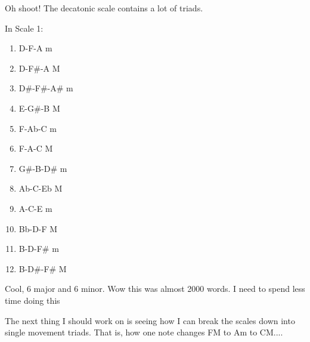 \documentclass[12pt]{article}[titlepage]
\newcommand{\1}{\={a}}
\newcommand{\2}{\={e}}
\newcommand{\3}{\={\i}}
\newcommand{\4}{\=o}
\newcommand{\5}{\=u}
\newcommand{\6}{\={A}}
\renewcommand{\,}{\textsuperscript{,}}
\begin{document}
Oh shoot!
The decatonic scale contains a lot of triads.

In Scale 1:
\begin{enumerate}
\item D-F-A m 
\item D-F\#-A M 
\item D\#-F\#-A\# m
\item E-G\#-B M
\item F-Ab-C m
\item F-A-C M
\item G\#-B-D\# m
\item Ab-C-Eb M
\item A-C-E m
\item Bb-D-F M
\item B-D-F\# m
\item B-D\#-F\# M
\end{enumerate}

Cool, 6 major and 6 minor.
Wow this was almost 2000 words.
I need to spend less time doing this

The next thing I should work on is seeing how I can break the scales down into single movement triads.
That is, how one note changes FM to Am to CM.... 
\end{document}
